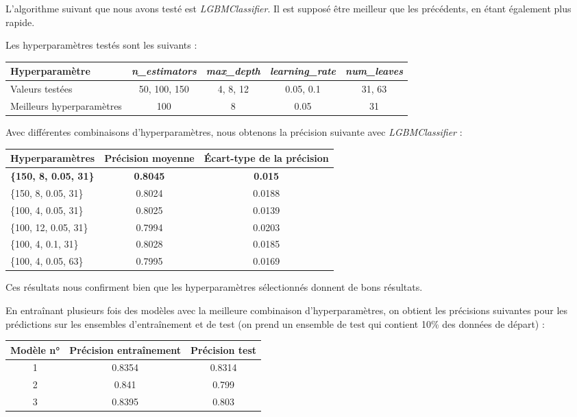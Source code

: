 \documentclass[a4paper]{article}
\begin{document}
    L'algorithme suivant que nous avons testé est {\it LGBMClassifier}. Il est supposé être meilleur que les précédents,
    en étant également plus rapide.
    
    Les hyperparamètres testés sont les suivants :

    \begin{tabular}{| l | *{4}{c|}}
        \hline
        Hyperparamètre & {\it n\_estimators} & {\it max\_depth} & {\it learning\_rate} & {\it num\_leaves} 
        \tabularnewline
        \hline
        Valeurs testées & 50, 100, 150 & 4, 8, 12 & 0.05, 0.1 & 31, 63
        \tabularnewline
        \hline
        Meilleurs hyperparamètres & 100 & 8 & 0.05 & 31
        \tabularnewline
        \hline
    \end{tabular}
    
    Avec différentes combinaisons d'hyperparamètres, nous obtenons la précision suivante avec {\it LGBMClassifier} :

    \begin{tabular}{| l | *{2}{c|}}
        \hline
        Hyperparamètres & Précision moyenne & Écart-type de la précision
        \tabularnewline
        \hline
        \textbf{\{150, 8, 0.05, 31\}} & \textbf{0.8045} & \textbf{0.015}
        \tabularnewline
        \hline
        \{150, 8, 0.05, 31\} & 0.8024 & 0.0188
        \tabularnewline
        \hline
        \{100, 4, 0.05, 31\} & 0.8025 & 0.0139
        \tabularnewline
        \hline
        \{100, 12, 0.05, 31\} & 0.7994 & 0.0203
        \tabularnewline
        \hline
        \{100, 4, 0.1, 31\} & 0.8028 & 0.0185
        \tabularnewline
        \hline
        \{100, 4, 0.05, 63\} & 0.7995 & 0.0169
        \tabularnewline
        \hline
    \end{tabular}

    Ces résultats nous confirment bien que les hyperparamètres sélectionnés donnent de bons résultats.

    En entraînant plusieurs fois des modèles avec la meilleure combinaison d'hyperparamètres, 
    on obtient les précisions suivantes pour les prédictions 
    sur les ensembles d'entraînement et de test (on prend un ensemble de test qui contient 10\% des données de départ) :

    \begin{tabular}{| *{3}{c|}}
        \hline
        Modèle n° & Précision entraînement & Précision test
        \tabularnewline
        \hline
        1 & 0.8354 & 0.8314
        \tabularnewline
        \hline
        2 & 0.841 & 0.799
        \tabularnewline
        \hline
        3 & 0.8395 & 0.803
        \tabularnewline
        \hline
    \end{tabular}
\end{document}
